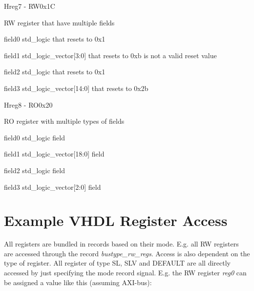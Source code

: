 \documentclass{article}
\begin{document}
\begin{register}{H}{reg7 - RW}{0x1C}
  \par RW register that have multiple fields \regnewline
  \label{reg7}
  \regnewline
  \begin{regdesc}\begin{reglist}[field0]
    \item [field0] std\_logic that resets to 0x1
    \item [field1] std\_logic\_vector[3:0] that resets to 0xb is not a valid reset value
    \item [field2] std\_logic that resets to 0x1
    \item [field3] std\_logic\_vector[14:0] that resets to 0x2b
  \end{reglist}\end{regdesc}
\end{register}

\begin{register}{H}{reg8 - RO}{0x20}
  \par RO register with multiple types of fields \regnewline
  \label{reg8}
  \regnewline
  \begin{regdesc}\begin{reglist}[field0]
    \item [field0] std\_logic field
    \item [field1] std\_logic\_vector[18:0] field
    \item [field2] std\_logic field
    \item [field3] std\_logic\_vector[2:0] field
  \end{reglist}\end{regdesc}
\end{register}

\section{Example VHDL Register Access}

\par
All registers are bundled in records based on their mode. E.g. all RW registers are accessed through the record \textit{bustype\_rw\_regs}. Access is also dependent on the type of register. All register of type SL, SLV and DEFAULT are all directly accessed by just specifying the mode record signal. E.g. the RW register \textit{reg0} can be assigned a value like this (assuming AXI-bus):
\end{document}
